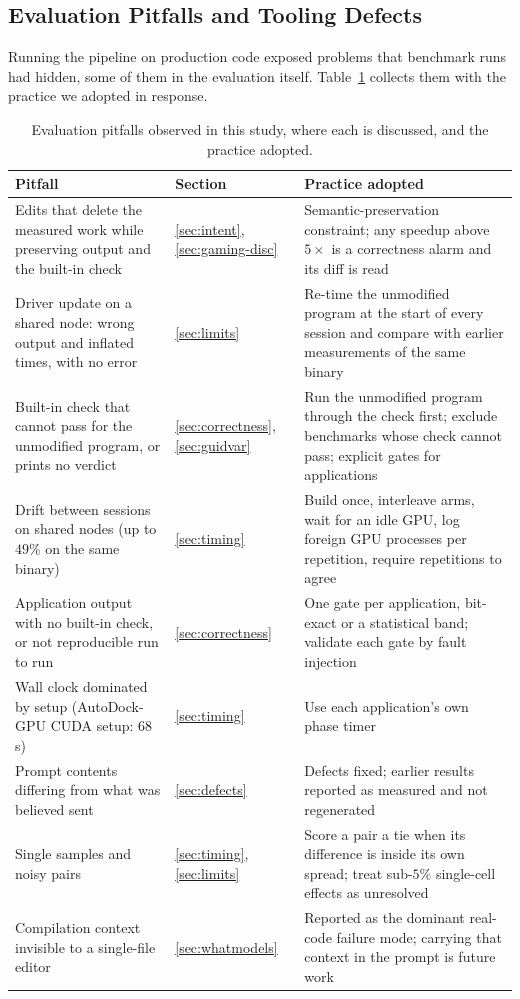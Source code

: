 \subsection{Evaluation Pitfalls and Tooling Defects}
\label{sec:pitfalls}
\label{sec:defects}
Running the pipeline on production code exposed problems that benchmark runs had hidden, some of them
in the evaluation itself. Table~\ref{tab:pitfalls} collects them with the practice we adopted in
response.

\begin{table}[t]
\centering
\footnotesize
\caption{Evaluation pitfalls observed in this study, where each is discussed, and the practice adopted.}
\label{tab:pitfalls}
\begin{tabular}{@{}p{}p{}p{}@{}}
\toprule
\textbf{Pitfall} & \textbf{Section} & \textbf{Practice adopted} \\
\midrule
Edits that delete the measured work while preserving output and the built-in check
  & \ref{sec:intent}, \ref{sec:gaming-disc} & Semantic-preservation constraint; any speedup above $5\times$ is a correctness alarm and its diff is read \\
Driver update on a shared node: wrong output and inflated times, with no error
  & \ref{sec:limits} & Re-time the unmodified program at the start of every session and compare with earlier measurements of the same binary \\
Built-in check that cannot pass for the unmodified program, or prints no verdict
  & \ref{sec:correctness}, \ref{sec:guidvar} & Run the unmodified program through the check first; exclude benchmarks whose check cannot pass; explicit gates for applications \\
Drift between sessions on shared nodes (up to $49\%$ on the same binary)
  & \ref{sec:timing} & Build once, interleave arms, wait for an idle GPU, log foreign GPU processes per repetition, require repetitions to agree \\
Application output with no built-in check, or not reproducible run to run
  & \ref{sec:correctness} & One gate per application, bit-exact or a statistical band; validate each gate by fault injection \\
Wall clock dominated by setup (AutoDock-GPU CUDA setup: $68$\,s)
  & \ref{sec:timing} & Use each application's own phase timer \\
Prompt contents differing from what was believed sent
  & \ref{sec:defects} & Defects fixed; earlier results reported as measured and not regenerated \\
Single samples and noisy pairs
  & \ref{sec:timing}, \ref{sec:limits} & Score a pair a tie when its difference is inside its own spread; treat sub-$5\%$ single-cell effects as unresolved \\
Compilation context invisible to a single-file editor
  & \ref{sec:whatmodels} & Reported as the dominant real-code failure mode; carrying that context in the prompt is future work \\
\bottomrule
\end{tabular}
\end{table}

